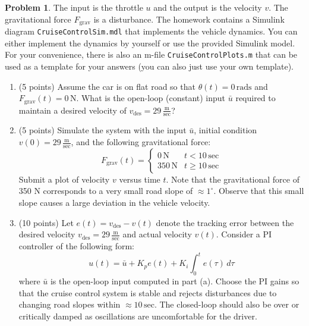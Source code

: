 \documentclass[12pt]{article}
\theoremstyle{definition}
\newtheorem{problem}{Problem}
\begin{document}
\begin{problem}
The input is the throttle \( u \) and the output is the velocity \( v \). The gravitational force \( F_{\text{grav}} \) is a disturbance. The homework contains a Simulink diagram \texttt{CruiseControlSim.mdl} that implements the vehicle dynamics. You can either implement the dynamics by yourself or use the provided Simulink model. For your convenience, there is also an m-file \texttt{CruiseControlPlots.m} that can be used as a template for your answers (you can also just use your own template).

\newpage
\begin{enumerate}[label=(\alph*)]

    \item (5 points) Assume the car is on flat road so that \( \theta(t) = 0 \, \text{rads} \) and \( F_{\text{grav}}(t) = 0 \, \text{N} \). What is the open-loop (constant) input \( \bar{u} \) required to maintain a desired velocity of \( v_{\text{des}} = 29 \, \frac{\text{m}}{\text{sec}} \)?
    
    \item (5 points) Simulate the system with the input \( \bar{u} \), initial condition \( v(0) = 29 \, \frac{\text{m}}{\text{sec}} \), and the following gravitational force:
    \[
    F_{\text{grav}}(t) = 
    \begin{cases} 
    0 \, \text{N} & t < 10 \, \text{sec} \\
    350 \, \text{N} & t \geq 10 \, \text{sec}
    \end{cases}
    \]
    Submit a plot of velocity \( v \) versus time \( t \). Note that the gravitational force of 350 N corresponds to a very small road slope of \( \approx 1^\circ \). Observe that this small slope causes a large deviation in the vehicle velocity.

    \item (10 points) Let \( e(t) = v_{\text{des}} - v(t) \) denote the tracking error between the desired velocity \( v_{\text{des}} = 29 \, \frac{\text{m}}{\text{sec}} \) and actual velocity \( v(t) \). Consider a PI controller of the following form:
\begin{equation}
    u(t) = \bar{u} + K_p e(t) + K_i \int_0^t e(\tau) \, d\tau \tag{7}
\end{equation}
where \( \bar{u} \) is the open-loop input computed in part (a). Choose the PI gains so that the cruise control system is stable and rejects disturbances due to changing road slopes within \( \approx 10 \, \text{sec} \). The closed-loop should also be over or critically damped as oscillations are uncomfortable for the driver. 


\end{enumerate}
\end{problem}
\end{document}
